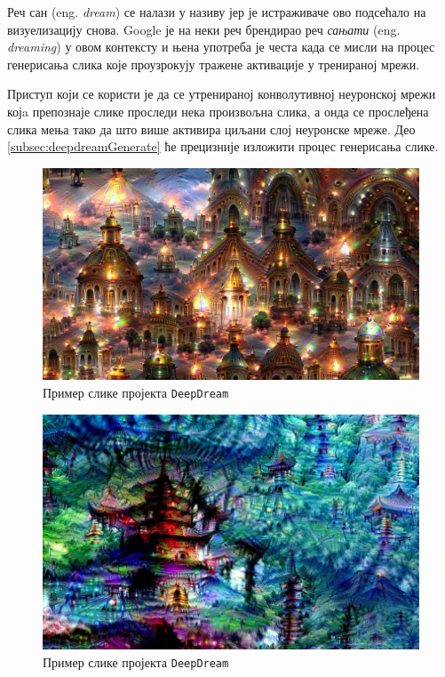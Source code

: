 \documentclass[a4paper]{article}
\begin{document}
Реч сан (eng. \textit{dream}) се налази у називу јер је истраживаче ово
подсећало на визуелизацију снова. Google је на неки реч брендирао реч
\textit{сањати} (eng. \textit{dreaming}) у овом контексту и њена употреба је честа када
се мисли на процес генерисања слика које проузрокују тражене активације у тренираној мрежи.

Приступ који се користи је да се утренираној конволутивној неуронској мрежи којa препознаје слике
проследи нека произвољна слика, а онда се прослеђена слика мења тако да што више активира циљани
слој неуронске мреже. Део \ref{subsec:deepdreamGenerate} ће прецизније изложити процес генерисања слике.

\begin{figure}[h!]
\begin{center}
    \includegraphics[width=\textwidth]{./resources/deepdream1.jpg}
\end{center}
\caption{Пример слике пројекта \texttt{DeepDream}}
\label{fig:deepdream1}
\end{figure}

\begin{figure}[h!]
\begin{center}
    \includegraphics[width=\textwidth]{./resources/deepdream2.jpg}
\end{center}
\caption{Пример слике пројекта \texttt{DeepDream}}
\label{fig:deepdream2}
\end{figure}
\end{document}
